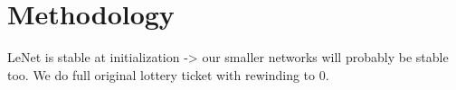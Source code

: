\section{Methodology}


LeNet is stable at initialization -> our smaller networks will probably be stable too. We do full original lottery ticket with rewinding to 0.

